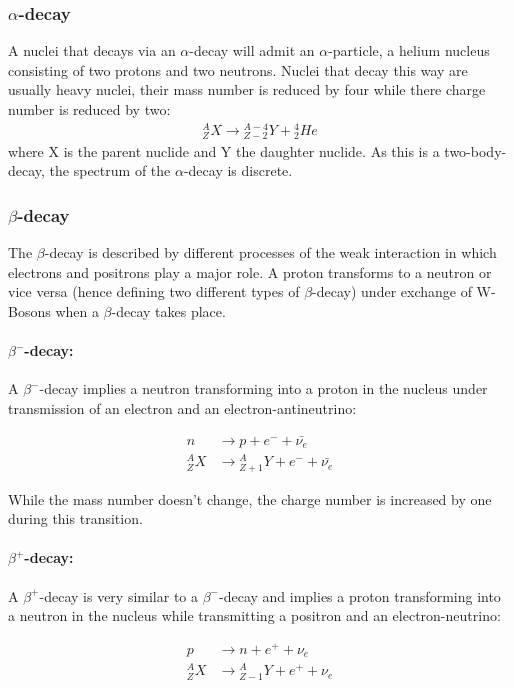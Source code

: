 \documentclass[12pt]{article}
\begin{document}
\subsubsection{$\alpha$-decay \label{alpha}}

A nuclei that decays via an $\alpha$-decay will admit an $\alpha$-particle, a helium nucleus consisting of two protons and two neutrons. Nuclei that decay this way are usually heavy nuclei, their mass number is reduced by four while there charge number is reduced by two:
\begin{align}
{}_Z^A X \rightarrow {}_{Z-2}^{A-4} Y + {}^4_2He
\end{align}
where X is the parent nuclide and Y the daughter nuclide. As this is a  two-body-decay, the spectrum of the $\alpha$-decay is discrete.
\subsubsection{$\beta$-decay \label{beta}}
The $\beta$-decay is described by different processes of the weak interaction
in which electrons and positrons play a major role. A proton transforms to a neutron or vice versa (hence defining two different types of $\beta$-decay) under exchange of W-Bosons when a $\beta$-decay takes place.


\paragraph*{$\beta^-$-decay:} 
A $\beta^-$-decay implies a neutron transforming into a proton in the nucleus under transmission of an electron and an electron-antineutrino:

\begin{align*}
n &\rightarrow p + e^- + \bar{\nu_e}\\
{}_Z^A X &\rightarrow {}_{Z+1}^A Y + e^- + \bar{\nu_e}
\end{align*}

While the mass number doesn't change, the charge number is increased by one during this transition.

\paragraph*{$\beta^+$-decay:}
A $\beta^+$-decay is very similar to a $\beta^-$-decay and implies a proton transforming into a neutron in the nucleus while transmitting a positron and an electron-neutrino:

\begin{align*}
p &\rightarrow n + e^+ + \nu_e\\
{}_Z^A X &\rightarrow {}_{Z-1}^A Y + e^+ + \nu_e
\end{align*}
\end{document}

